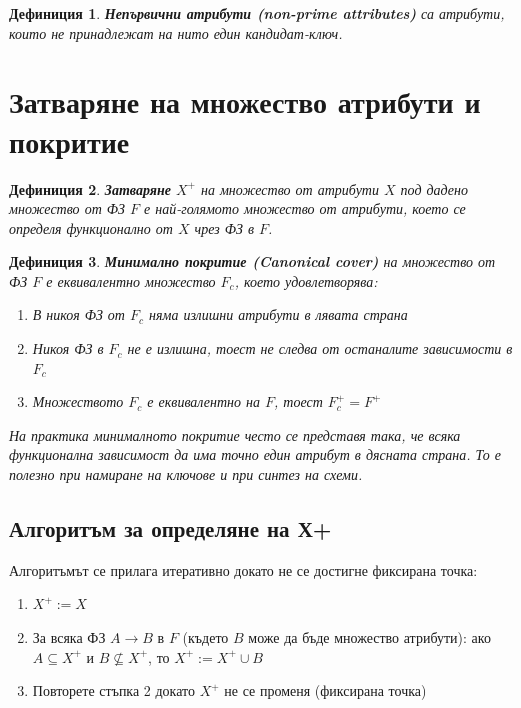 \documentclass{scrartcl}
\newtheorem{definition}{Дефиниция}
\begin{document}
\begin{FlushLeft}
\begin{definition}
\textbf{\textit{Непървични атрибути (non-prime attributes)}} са атрибути, които не принадлежат на нито един кандидат-ключ.
\end{definition}

\section{Затваряне на множество атрибути и покритие}

\begin{definition}
\textbf{\textit{Затваряне}} $X^+$ на множество от атрибути $X$ под дадено множество от ФЗ $F$ е най-голямото множество от атрибути, което се определя функционално от $X$ чрез ФЗ в $F$.
\end{definition}

\begin{definition}
\textbf{\textit{Минимално покритие (Canonical cover)}} на множество от ФЗ $F$ е еквивалентно множество $F_c$, което удовлетворява:
\begin{enumerate}
    \item В никоя ФЗ от $F_c$ няма излишни атрибути в лявата страна
    \item Никоя ФЗ в $F_c$ не е излишна, тоест не следва от останалите зависимости в $F_c$
    \item Множеството $F_c$ е еквивалентно на $F$, тоест $F_c^+ = F^+$
\end{enumerate}
На практика минималното покритие често се представя така, че всяка функционална зависимост да има точно един атрибут в дясната страна. То е полезно при намиране на ключове и при синтез на схеми.
\end{definition}

\subsection{Алгоритъм за определяне на Х+}

Алгоритъмът се прилага итеративно докато не се достигне фиксирана точка:

\begin{enumerate}
    \item $X^+ := X$
    \item За всяка ФЗ $A \rightarrow B$ в $F$ (където $B$ може да бъде множество атрибути): ако $A \subseteq X^+$ и $B \not\subseteq X^+$, то $X^+ := X^+ \cup B$
    \item Повторете стъпка 2 докато $X^+$ не се променя (фиксирана точка)
\end{enumerate}


\end{FlushLeft}
\end{document}
